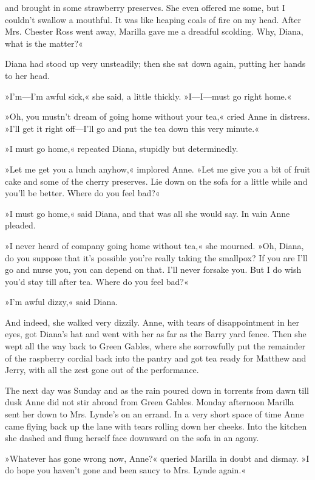 and brought in some strawberry preserves. She even offered me some, but I couldn't swallow a mouthful. It was like heaping coals of fire on my head. After Mrs. Chester Ross went away, Marilla gave me a dreadful scolding. Why, Diana, what is the matter?«

Diana had stood up very unsteadily; then she sat down again, putting her hands to her head.

»I'm—I'm awful sick,« she said, a little thickly. »I—I—must go right home.«

»Oh, you mustn't dream of going home without your tea,« cried Anne in distress. »I'll get it right off—I'll go and put the tea down this very minute.«

»I must go home,« repeated Diana, stupidly but determinedly.

»Let me get you a lunch anyhow,« implored Anne. »Let me give you a bit of fruit cake and some of the cherry preserves. Lie down on the sofa for a little while and you'll be better. Where do you feel bad?«

»I must go home,« said Diana, and that was all she would say. In vain Anne pleaded.

»I never heard of company going home without tea,« she mourned. »Oh, Diana, do you suppose that it's possible you're really taking the smallpox? If you are I'll go and nurse you, you can depend on that. I'll never forsake you. But I do wish you'd stay till after tea. Where do you feel bad?«

»I'm awful dizzy,« said Diana.

And indeed, she walked very dizzily. Anne, with tears of disappointment in her eyes, got Diana's hat and went with her as far as the Barry yard fence. Then she wept all the way back to Green Gables, where she sorrowfully put the remainder of the raspberry cordial back into the pantry and got tea ready for Matthew and Jerry, with all the zest gone out of the performance.

The next day was Sunday and as the rain poured down in torrents from dawn till dusk Anne did not stir abroad from Green Gables. Monday afternoon Marilla sent her down to Mrs. Lynde's on an errand. In a very short space of time Anne came flying back up the lane with tears rolling down her cheeks. Into the kitchen she dashed and flung herself face downward on the sofa in an agony.

»Whatever has gone wrong now, Anne?« queried Marilla in doubt and dismay. »I do hope you haven't gone and been saucy to Mrs. Lynde again.«

